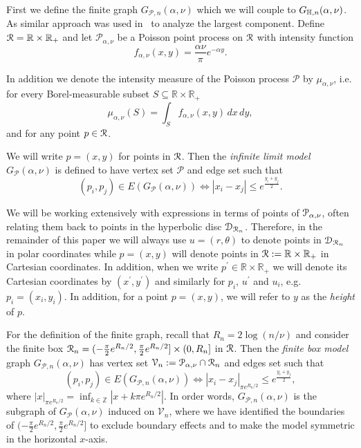 First we define the finite graph $G_{\mathcal{P},n}(\alpha, \nu)$ which we will couple to $G_{\mathbb{H}, n}(\alpha, \nu)$. As similar approach was used in~\cite{fountoulakis2018law} to analyze the largest component. Define ${\mathcal R} = \mathbb{R} \times \mathbb{R}_+$ and let $\mathcal{P}_{\alpha,\nu}$ be a Poisson point process on ${\mathcal R}$ with intensity function
\begin{equation}\label{eq:def_intensity_function_f}
	f_{\alpha,\nu}(x,y) = \frac{\alpha \nu}{\pi} e^{-\alpha y}.
\end{equation} 

In addition we denote the intensity measure of the Poisson process $\mathcal{P}$ by $\mu_{\alpha, \nu}$, i.e. for every Borel-measurable subset $S \subseteq \mathbb{R} \times \mathbb{R}_+$
\begin{equation}\label{eq:def_mu_P}
	\mu_{\alpha,\nu}(S) = \int_S f_{\alpha,\nu}(x,y) \, dx \, dy,
\end{equation}
and for any point $p \in {\mathcal R}$.

We will write $p = (x, y)$ for points in ${\mathcal R}$. Then the \emph{infinite limit model} $G_{\mathcal{P}}(\alpha, \nu)$ is defined to have vertex set $\mathcal{P}$ and edge set such that
\[
	(p_i, p_j) \in E(G_{\mathcal{P}}(\alpha, \nu)) \iff |x_i - x_j| \leq e^{\frac{y_i + y_j}{2}}.
\]

\begin{remark}\label{rmk:point_notation}
We will be working extensively with expressions in terms of points of ${\mathcal P}_{\alpha, \nu}$, often relating them back to points in the hyperbolic disc ${\mathcal D}_{{\mathcal R}_n}$. Therefore, in the remainder of this paper we will always use $u = (r,\theta)$ to denote points in ${\mathcal D}_{{\mathcal R}_n}$ in polar coordinates while $p = (x,y)$ will denote points in ${\mathcal R} := \mathbb{R} \times \mathbb{R}_+$ in Cartesian coordinates. In addition, when we write $p^\prime \in \mathbb{R} \times \mathbb{R}_+$ we will denote its Cartesian coordinates by $(x^\prime, y^\prime)$ and similarly for $p_i$, $u^\prime$ and $u_i$, e.g. $p_i = (x_i, y_i)$. In addition, for a point $p = (x,y)$, we will refer to $y$ as the \emph{height} of $p$.
\end{remark}

For the definition of the finite graph, recall that $R_n = 2\log(n/\nu)$ and consider the finite box ${\mathcal R}_n = (-\frac{\pi}{2}e^{R_n/2}, \frac{\pi}{2}e^{R_n/2}] \times (0, R_n]$ in ${\mathcal R}$. Then the \emph{finite box model} graph $G_{\mathcal{P},n}(\alpha, \nu)$ has vertex set $\mathcal{V}_n := \mathcal{P}_{\alpha, \nu} \cap {\mathcal R}_n$ and edges set such that
\[
	(p_i, p_j) \in E(G_{\mathcal{P},n}(\alpha, \nu)) \iff |x_i - x_j|_{\pi e^{R_n/2}} \leq e^{\frac{y_i + y_j}{2}},
\]
where $|x|_{\pi e^{R_n/2}} = \inf_{k \in \mathbb{Z}} |x + k \pi e^{R_n/2}|$. In order words, $G_{\mathcal{P},n}(\alpha, \nu)$ is the subgraph of $G_{\mathcal{P}}(\alpha, \nu)$ induced on $\mathcal{V}_n$, where we have identified the boundaries of $(-\frac{\pi}{2}e^{R_n/2}, \frac{\pi}{2}e^{R_n/2}]$ to exclude boundary effects and to make the model symmetric in the horizontal $x$-axis. 

